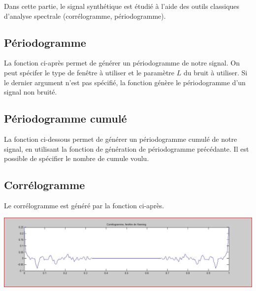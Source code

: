\documentclass[a4paper,11pt]{article}
\newcommand{\FSource}[1]{%
  
  }
\begin{document}
Dans cette partie, le signal synthétique est étudié à l'aide des outils classiques d'analyse spectrale (corrélogramme, périodogramme).

\subsection{Périodogramme}

La fonction ci-après permet de générer un périodogramme de notre signal. On peut
spécifer le type de fenêtre à utiliser et le paramètre $L$ du bruit à utiliser.
Si le dernier argument n'est pas spécifié, la fonction génère le périodogramme
d'un signal non bruité.


\vspace{0.5cm}

\FSource{matlab/3.m}

\vspace{0.5cm}

\subsection{Périodogramme cumulé}

La fonction ci-dessous permet de générer un périodogramme cumulé de notre
signal, en utilisant la fonction de génération de périodogramme précédante. Il
est possible de spécifier le nombre de cumule voulu.


\vspace{0.5cm}

\FSource{matlab/4.m}

\vspace{0.5cm}

\subsection{Corrélogramme}

Le corrélogramme est généré par la fonction ci-après.

\FSource{matlab/5.m}

\vspace{0.5cm}

\includegraphics[width=15cm]{capture/correlo.JPG}
\end{document}
